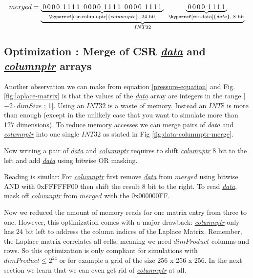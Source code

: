 \begin{figure*}
\[
  merged = \underbrace{\underbrace{\;0\,0\,0\,0\:\:1\,1\,1\,1\;\;0\,0\,0\,0\:\:1\,1\,1\,1\;\;0\,0\,0\,0\:\:1\,1\,1\,1\;}_\text{\hyperref[csr-columnptr]{\textit{columnptr}}, 24 bit}\;\;\underbrace{\;0\,0\,0\,0\:\:1\,1\,1\,1\;}_\text{\hyperref[csr-data]{\textit{data}}, 8 bit}}_{INT32}
\]
\caption{\hyperref[csr-data]{\textit{data}} and \hyperref[csr-columnptr]{\textit{columnptr}} entry merged into one $INT32$}
\label{fig:data-columnptr-merge}
\end{figure*} 

\subsection{Optimization : Merge of CSR \hyperref[csr-data]{\textit{data}} and \hyperref[csr-columnptr]{\textit{columnptr}} arrays}
Another observation we can make from equation \ref{pressure-equation} and Fig. \ref{fig:laplace-matrix} is that the values of the \hyperref[csr-data]{\textit{data}} array are integers in the range [$-2 \cdot dimSize$ ; 1]. Using an $INT32$ is a waste of memory. Instead an $INT8$ is more than enough (except in the unlikely case that you want to simulate more than 127 dimensions). To reduce memory accesses we can merge pairs of \hyperref[csr-data]{\textit{data}} and \hyperref[csr-columnptr]{\textit{columnptr}} into one single $INT32$ as stated in Fig \ref{fig:data-columnptr-merge}. 
\par Now writing a pair of \hyperref[csr-data]{\textit{data}} and \hyperref[csr-columnptr]{\textit{columnptr}} requires to shift \hyperref[csr-columnptr]{\textit{columnptr}} 8 bit to the left and add  \hyperref[csr-data]{\textit{data}} using bitwise OR masking.
\par Reading is similar: For \hyperref[csr-columnptr]{\textit{columnptr}} first remove \hyperref[csr-data]{\textit{data}} from $merged$ using bitwise AND with 0xFFFFFF00 then shift the result 8 bit to the right. To read \hyperref[csr-data]{\textit{data}}, mask off \hyperref[csr-columnptr]{\textit{columnptr}} from $merged$ with the 0x000000FF.
\par Now we reduced the amount of memory reads for one matrix entry from three to one. However, this optimization comes with a major drawback: \hyperref[csr-columnptr]{\textit{columnptr}} only has 24 bit left to address the column indices of the Laplace Matrix. Remember, the Laplace matrix correlates all cells, meaning we need $dimProduct$ columns and rows. So this optimization is only compliant for simulations with $dimProduct \leq 2^{24}$ or for example a grid of the size 256 x 256 x 256. In the next section we learn that we can even get rid of \hyperref[csr-columnptr]{\textit{columnptr}} at all.
